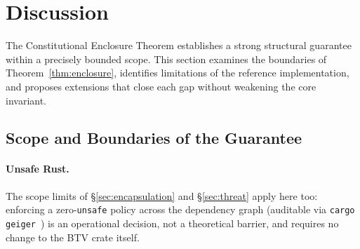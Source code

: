 
\section{Discussion}
\label{sec:discussion}

The Constitutional Enclosure Theorem establishes a strong structural
guarantee within a precisely bounded scope. This section examines the boundaries of
Theorem~\ref{thm:enclosure}, identifies limitations of the reference
implementation, and proposes extensions that close each gap without
weakening the core invariant.

\subsection{Scope and Boundaries of the Guarantee}
\label{sec:scope}

\paragraph*{Unsafe Rust.}
The scope limits of \S\ref{sec:encapsulation} and \S\ref{sec:threat}
apply here too: enforcing a zero-\texttt{unsafe} policy across the
dependency graph (auditable via \texttt{cargo geiger}~\cite{cargogeiger})
is an operational decision, not a theoretical barrier, and requires no
change to the BTV crate itself.

